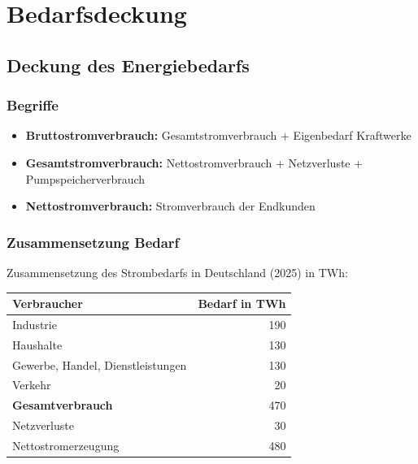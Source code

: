 \section{Bedarfsdeckung}

\subsection{Deckung des Energiebedarfs}
\subsubsection{Begriffe}
    {\small 
        \begin{itemize}
            \item \textbf{Bruttostromverbrauch: } Gesamtstromverbrauch + Eigenbedarf Kraftwerke
            \item \textbf{Gesamtstromverbrauch: } Nettostromverbrauch + Netzverluste + Pumpspeicherverbrauch
            \item \textbf{Nettostromverbrauch: } Stromverbrauch der Endkunden
        \end{itemize}
    }

\subsubsection{Zusammensetzung Bedarf}
    {\small Zusammensetzung des Strombedarfs in Deutschland (2025) in TWh: \\ 
    }
    \begin{table}[H]
        \begin{tabular}{l r}
            \textbf{Verbraucher} & \textbf{Bedarf in TWh} \\
            \toprule
            Industrie & 190 \\
            Haushalte & 130 \\
            Gewerbe, Handel, Dienstleistungen & 130 \\
            Verkehr & 20 \\
            \midrule
            \textbf{Gesamtverbrauch} & 470 \\
            \bottomrule
            Netzverluste & 30 \\
            Nettostromerzeugung & 480 \\
        \end{tabular}
    \end{table}

